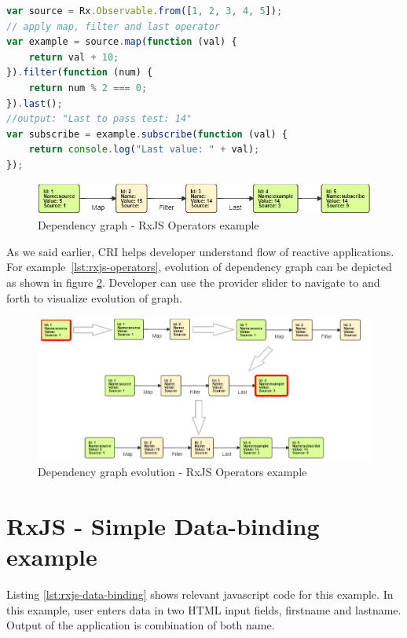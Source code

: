 \begin{lstlisting}[language=JavaScript, caption=RxJS - Operators example, label={lst:rxjs-operators}]
var source = Rx.Observable.from([1, 2, 3, 4, 5]);
// apply map, filter and last operator
var example = source.map(function (val) {
	return val + 10;
}).filter(function (num) {
	return num % 2 === 0;
}).last();
//output: "Last to pass test: 14"
var subscribe = example.subscribe(function (val) {
	return console.log("Last value: " + val);
});
\end{lstlisting}

\begin{figure}[!h]
	\centering
	\includegraphics[scale=0.7,trim=0 0 0 0]{images/RxJS-operators/final.png}
	\caption{Dependency graph - RxJS Operators example}
	\label{fig:rxjs-operators-dg}
\end{figure}

As we said earlier, CRI helps developer understand flow of reactive applications. For example~\ref{lst:rxjs-operators}, evolution of dependency graph can be depicted as shown in figure \ref{fig:rxjs-operators-dg-evolution}. Developer can use the provider slider to navigate to and forth to visualize evolution of graph.

\begin{figure}[!h]
	\centering
	\includegraphics[scale=0.7,trim=0 0 0 0]{images/RxJS-operators/steps-all.png}
	\caption{Dependency graph evolution - RxJS Operators example}
	\label{fig:rxjs-operators-dg-evolution}
\end{figure}

\section{RxJS - Simple Data-binding example}
Listing \ref{lst:rxjs-data-binding} shows relevant javascript code for this example. In this example, user enters data in two HTML input fields, firstname and lastname. Output of the application is combination of both name. 


